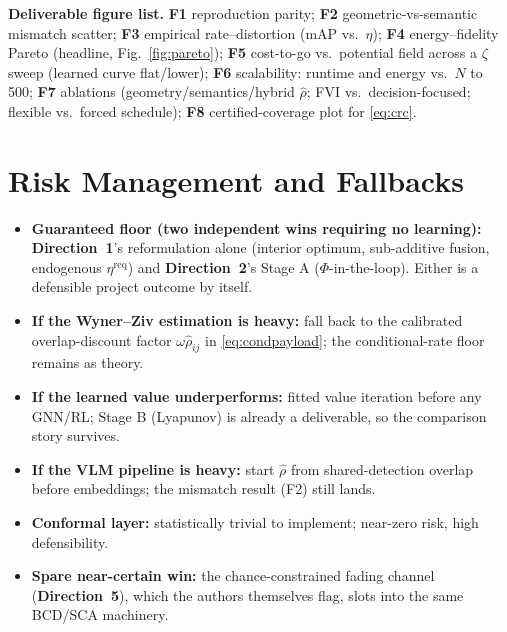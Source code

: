 \documentclass[11pt,a4paper]{article}
\newcommand{\Dir}[1]{\textcolor{accent}{\textbf{Direction~#1}}}
\begin{document}
\noindent\textbf{Deliverable figure list.} \textbf{F1} reproduction parity; \textbf{F2} geometric-vs-semantic mismatch scatter; \textbf{F3} empirical rate--distortion (mAP vs.\ $\eta$); \textbf{F4} energy--fidelity Pareto (headline, Fig.~\ref{fig:pareto}); \textbf{F5} cost-to-go vs.\ potential field across a $\zeta$ sweep (learned curve flat/lower); \textbf{F6} scalability: runtime and energy vs.\ $N$ to 500; \textbf{F7} ablations (geometry/semantics/hybrid $\hat\rho$; FVI vs.\ decision-focused; flexible vs.\ forced schedule); \textbf{F8} certified-coverage plot for \eqref{eq:crc}.

\section{Risk Management and Fallbacks}
\begin{itemize}
\item \textbf{Guaranteed floor (two independent wins requiring no learning):} \Dir{1}'s reformulation alone (interior optimum, sub-additive fusion, endogenous $\eta^{\mathrm{req}}$) and \Dir{2}'s Stage A ($\Phi$-in-the-loop). Either is a defensible project outcome by itself.
\item \textbf{If the Wyner--Ziv estimation is heavy:} fall back to the calibrated overlap-discount factor $\omega\hat\rho_{ij}$ in \eqref{eq:condpayload}; the conditional-rate floor remains as theory.
\item \textbf{If the learned value underperforms:} fitted value iteration before any GNN/RL; Stage B (Lyapunov) is already a deliverable, so the comparison story survives.
\item \textbf{If the VLM pipeline is heavy:} start $\hat\rho$ from shared-detection overlap before embeddings; the mismatch result (F2) still lands.
\item \textbf{Conformal layer:} statistically trivial to implement; near-zero risk, high defensibility.
\item \textbf{Spare near-certain win:} the chance-constrained fading channel (\Dir{5}), which the authors themselves flag, slots into the same BCD/SCA machinery.
\end{itemize}

\end{document}
